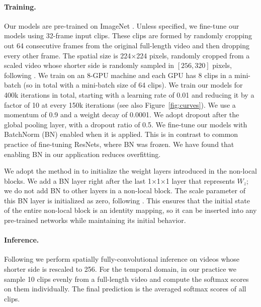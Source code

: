 \documentclass[10pt,twocolumn,letterpaper]{article}
\def\x{$\times$}
\begin{document}
\paragraph{Training.} Our models are pre-trained on ImageNet \cite{Russakovsky2015}. Unless specified, we fine-tune our models using 32-frame input clips. These clips are formed by randomly cropping out 64 consecutive frames from the original full-length video and then dropping every other frame. The spatial size is 224\x224 pixels, randomly cropped from a scaled video whose shorter side is randomly sampled in $[256, 320]$ pixels, following \cite{Simonyan2015}.
We train on an 8-GPU machine and each GPU has 8 clips in a mini-batch (so in total with a mini-batch size of 64 clips). We train our models for 400k iterations in total, starting with a learning rate of 0.01 and reducing it by a factor of 10 at every 150k iterations (see also Figure~\ref{fig:curves}). We use a momentum of 0.9 and a weight decay of 0.0001. We adopt dropout \cite{Hinton2012} after the global pooling layer, with a dropout ratio of 0.5.
We fine-tune our models with BatchNorm (BN) \cite{Ioffe2015} enabled when it is applied. This is in contrast to common practice \cite{He2016} of fine-tuning ResNets, where BN was frozen. We have found that enabling BN in our application reduces overfitting.

We adopt the method in \cite{He2015} to initialize the weight layers introduced in the non-local blocks. We add a BN layer right after the last 1\x1\x1 layer that represents $W_z$; we do not add BN to other layers in a non-local block. The scale parameter of this BN layer is initialized as zero, following \cite{Goyal2017}. This ensures that the initial state of the entire non-local block is an identity mapping, so it can be inserted into any pre-trained networks while maintaining its initial behavior.

\paragraph{Inference.} Following \cite{Simonyan2015} we perform spatially fully-convolutional inference on videos whose shorter side is rescaled to 256.
For the temporal domain, in our practice we sample 10 clips evenly from a full-length video and compute the softmax scores on them individually. The final prediction is the averaged softmax scores of all clips.
\end{document}
